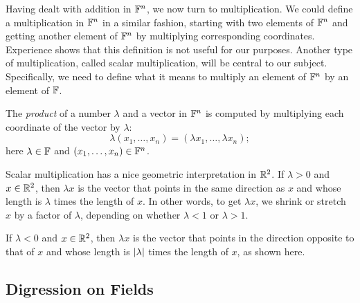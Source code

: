 Having dealt with addition in $\mathbb{F}^n$, we now turn to multiplication. We could
define a multiplication in $\mathbb{F}^n$ in a similar fashion, starting with two
elements of $\mathbb{F}^n$ and getting another element of $\mathbb{F}^n$ by multiplying
corresponding coordinates. Experience shows that this definition is not useful
for our purposes. Another type of multiplication, called scalar multiplication,
will be central to our subject. Specifically, we need to define what it means
to multiply an element of $\mathbb{F}^n$ by an element of $\mathbb{F}$.

\begin{definition}\label{ax:1.18}
The \emph{product} of a number $\lambda$ and a vector in $\mathbb{F}^n$ is computed by
multiplying each coordinate of the vector by $\lambda$:
\[ \lambda(x_1,\dots,x_n) = (\lambda x_1,\dots,\lambda x_n); \]
here $\lambda\in\mathbb{F}$ and $(x_1,\dots,x_n)\in\mathbb{F}^n$.
\end{definition}

%
Scalar multiplication has a nice geometric interpretation in $\mathbb{R}^2$. If
$\lambda>0$ and $x\in\mathbb{R}^2$, then $\lambda x$ is the vector that points in the
same direction as $x$ and whose length is $\lambda$ times the length of $x$. In
other words, to get $\lambda x$, we shrink or stretch $x$ by a factor of
$\lambda$, depending on whether $\lambda<1$ or $\lambda>1$.

%
If $\lambda<0$ and $x\in\mathbb{R}^2$, then $\lambda x$ is the vector that points in
the direction opposite to that of $x$ and whose length is $\lvert \lambda \rvert$ times
the length of $x$, as shown here.

\subsection{Digression on Fields}

